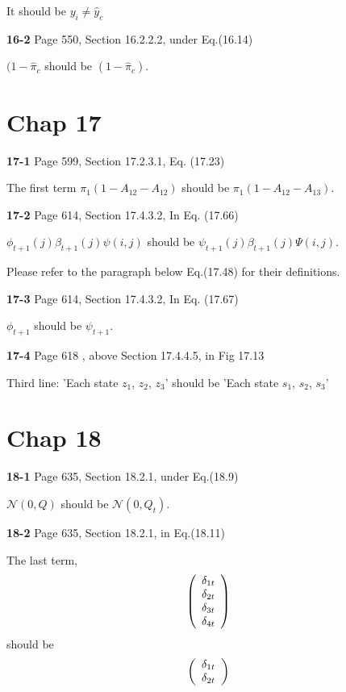 \documentclass[aps,preprint,a4]{revtex4-1}
\newcommand{\nl}{\nonumber \\}
\begin{document}
It should be $y_{i} \neq \hat{y}_{c}$

{\color{red}\textbf{16-2}} Page 550, Section 16.2.2.2, under Eq.(16.14)

$(1-\hat {\pi}_{c}$ should be $(1-\hat {\pi}_{c})$.


\section{Chap 17}
{\color{red}\textbf{17-1}} Page 599, Section 17.2.3.1, Eq. (17.23)

The first term $\pi_{1}(1-A_{12}-A_{12})$ should be $\pi_{1}(1-A_{12}-A_{13})$.

{\color{red}\textbf{17-2}} Page 614, Section 17.4.3.2, In Eq. (17.66)

$\phi_{t+1}(j)\beta_{t+1}(j)\psi(i,j)$ should be $\psi_{t+1}(j)\beta_{t+1}(j)\Psi(i,j)$.

Please refer to the paragraph below Eq.(17.48) for their definitions.

{\color{red}\textbf{17-3}} Page 614, Section 17.4.3.2, In Eq. (17.67)

$\phi_{t+1}$ should be $\psi_{t+1}$.

{\color{red}\textbf{17-4}} Page 618 , above Section 17.4.4.5, in Fig 17.13

Third line: 'Each state $z_{1}$, $z_{2}$, $z_{3}$' should be 'Each state $s_{1}$, $s_{2}$, $s_{3}$'


\section{Chap 18}
{\color{red}\textbf{18-1}} Page 635, Section 18.2.1, under Eq.(18.9)

$\mathcal N(0,Q)$ should be $\mathcal N(0,Q_{t})$.

{\color{red}\textbf{18-2}} Page 635, Section 18.2.1, in Eq.(18.11)

The last term,
\begin{equation}
\left(\begin{array}{c}\delta_{1t} \\ \delta_{2t} \\ \delta_{3t} \\ \delta_{4t}\end{array}\right)\nl
\end{equation}
should be
\begin{equation}
\left(\begin{array}{c}\delta_{1t} \\ \delta_{2t} \end{array}\right)\nl
\end{equation}
\end{document}
